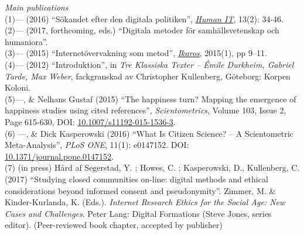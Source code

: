 \documentclass[a4paper,11pt,oneside]{article}
\begin{document}
      \noindent  \emph{Main publications} \\
      (1)--- (2016) ``Sökandet efter den digitala politiken'', \href{https://humanit.hb.se/article/view/504/572}{\emph{Human IT}}, 13(2): 34-46.\\
      (2)--- (2017, forthcoming, eds.) ``Digitala metoder för samhällsvetenskap och humaniora''.\\
      (3)--- (2015) ``Internetövervakning som metod'', \href{http://gup.ub.gu.se/records/fulltext/220443/220443.pdf}{\emph{Ikaros}}, 2015(1), pp 9–11.\\
      (4)--- (2012) ``Introduktion'', in \emph{Tre Klassiska Texter – Émile Durkheim, Gabriel Tarde, Max Weber}, fackgranskad av Christopher Kullenberg, Göteborg: Korpen Koloni.\\
      (5)---, \& Nelhans Gustaf (2015) ``The happiness turn? Mapping the emergence of happiness studies using cited references'', \emph{Scientometrics}, Volume 103, Issue 2, Page 615-630, DOI: \href{http://dx.doi.org/10.1007/s11192-015-1536-3}{10.1007/s11192-015-1536-3}.\\
      (6) ---, \& Dick Kasperowski (2016) ``What Is Citizen Science? – A Scientometric Meta-Analysis'', \emph{PLoS ONE}, 11(1): e0147152. DOI: \href{http://dx.doi.org/10.1371/journal.pone.0147152}{10.1371/journal.pone.0147152}.\\
      (7) (in press) Hård af Segerstad, Y. ; Howes, C. ; Kasperowski, D., Kullenberg, C. (2017) ``Studying closed communities on-line: digital methods and ethical considerations beyond informed consent and pseudonymity''. Zimmer, M. & Kinder-Kurlanda, K. (Eds.). \emph{Internet Research Ethics for the Social Age: New Cases and Challenges}. Peter Lang: Digital Formations (Steve Jones, series editor). (Peer-reviewed book chapter, accepted by publisher) \\



\end{document}
